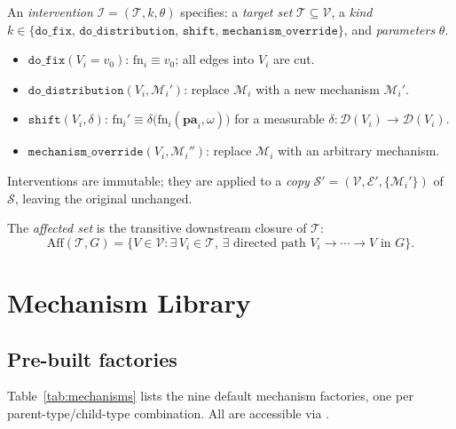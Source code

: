 \documentclass[article]{jss}
\begin{document}
\begin{definition}
\label{def:intervention}
An \emph{intervention} $\mathcal{I} = (\mathcal{T}, k, \theta)$ specifies:
a \emph{target set} $\mathcal{T}\subseteq\mathcal{V}$, a \emph{kind}
$k \in \{\mathtt{do\_fix},\, \mathtt{do\_distribution},\, \mathtt{shift},\,
\mathtt{mechanism\_override}\}$, and \emph{parameters} $\theta$.

\begin{itemize}[nosep,leftmargin=2em]
  \item $\mathtt{do\_fix}(V_i = v_0)$: $\mathrm{fn}_i \equiv v_0$; all edges
        into $V_i$ are cut.
  \item $\mathtt{do\_distribution}(V_i, \mathcal{M}_i')$: replace $\mathcal{M}_i$
        with a new mechanism $\mathcal{M}_i'$.
  \item $\mathtt{shift}(V_i, \delta)$: $\mathrm{fn}_i' \equiv
        \delta\bigl(\mathrm{fn}_i(\mathbf{pa}_i, \omega)\bigr)$ for a
        measurable $\delta:\mathcal{D}(V_i)\to\mathcal{D}(V_i)$.
  \item $\mathtt{mechanism\_override}(V_i, \mathcal{M}_i'')$: replace
        $\mathcal{M}_i$ with an arbitrary mechanism.
\end{itemize}

Interventions are immutable; they are applied to a \emph{copy}
$\mathcal{S}' = (\mathcal{V}, \mathcal{E}', \{\mathcal{M}_i'\})$ of $\mathcal{S}$,
leaving the original unchanged.

The \emph{affected set} is the transitive downstream closure of $\mathcal{T}$:
\[
  \mathrm{Aff}(\mathcal{T}, G) = \bigl\{V\in\mathcal{V} : \exists\, V_i\in\mathcal{T},\,
  \exists\text{ directed path } V_i \to \cdots \to V \text{ in } G\bigr\}.
\]
\end{definition}

\section{Mechanism Library}
\label{sec:mechanisms}

\subsection{Pre-built factories}
\label{sec:prebuilt}

Table~\ref{tab:mechanisms} lists the nine default mechanism factories, one per
parent-type/child-type combination. All are accessible via
.
\end{document}
